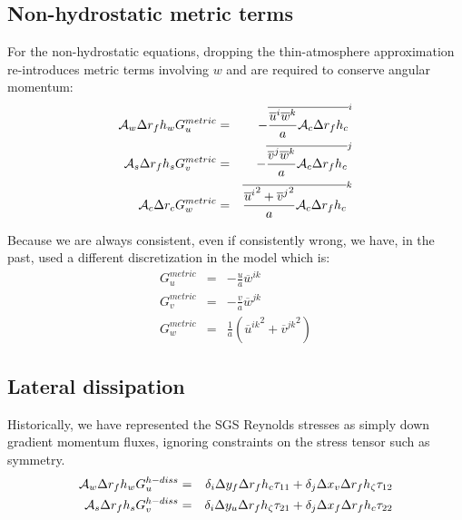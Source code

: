 \subsection{Non-hydrostatic metric terms}

For the non-hydrostatic equations, dropping the thin-atmosphere
approximation re-introduces metric terms involving $w$ and are
required to conserve angular momentum:
\begin{eqnarray}
{\cal A}_w \Delta r_f h_w G_u^{metric} & = &
- \overline{ \frac{ \overline{u}^i \overline{w}^k }{a} {\cal A}_c \Delta r_f h_c }^i \\
{\cal A}_s \Delta r_f h_s G_v^{metric} & = &
- \overline{ \frac{ \overline{v}^j \overline{w}^k }{a} {\cal A}_c \Delta r_f h_c}^j \\
{\cal A}_c \Delta r_c G_w^{metric} & = &
  \overline{ \frac{ {\overline{u}^i}^2 + {\overline{v}^j}^2}{a} {\cal A}_c \Delta r_f h_c }^k
\end{eqnarray}

Because we are always consistent, even if consistently wrong, we have,
in the past, used a different discretization in the model which is:
\begin{eqnarray}
G_u^{metric} & = &
- \frac{u}{a} \overline{w}^{ik} \\
G_v^{metric} & = &
- \frac{v}{a} \overline{w}^{jk} \\
G_w^{metric} & = &
  \frac{1}{a} ( {\overline{u}^{ik}}^2 + {\overline{v}^{jk}}^2 )
\end{eqnarray}



\subsection{Lateral dissipation}

Historically, we have represented the SGS Reynolds stresses as simply
down gradient momentum fluxes, ignoring constraints on the stress
tensor such as symmetry.
\begin{eqnarray}
{\cal A}_w \Delta r_f h_w G_u^{h-diss} & = &
  \delta_i  \Delta y_f \Delta r_f h_c \tau_{11}
+ \delta_j  \Delta x_v \Delta r_f h_\zeta \tau_{12} \\
{\cal A}_s \Delta r_f h_s G_v^{h-diss} & = &
  \delta_i  \Delta y_u \Delta r_f h_\zeta \tau_{21}
+ \delta_j  \Delta x_f \Delta r_f h_c \tau_{22}
\end{eqnarray}

